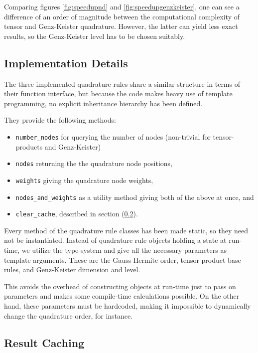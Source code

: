 Comparing figures \ref{fig:speedupnd} and \ref{fig:speedupgenzkeister}, one can
see a difference of an order of magnitude between the computational complexity
of tensor and Genz-Keister quadrature.
However, the latter can yield less exact results, so the Genz-Keister level has
to be chosen suitably.


\subsection{Implementation Details}

The three implemented quadrature rules share a similar structure in terms of
their function interface, but because the code makes heavy use of template
programming, no explicit inheritance hierarchy has been defined.

They provide the following methods:
\begin{itemize}
  \item \texttt{number\_nodes} for querying the number of nodes (non-trivial for
    tensor-products and Genz-Keister)
  \item \texttt{nodes} returning the the quadrature node positions,
  \item \texttt{weights} giving the quadrature node weights,
  \item \texttt{nodes\_and\_weights} as a utility method giving both of the
    above at once, and
  \item \texttt{clear\_cache}, described in section
    (\ref{subsec:resultcaching}).
\end{itemize}

Every method of the quadrature rule classes has been made static, so they need
not be instantiated.
Instead of quadrature rule objects holding a state at run-time, we utilize the
type-system and give all the necessary parameters as template arguments.
These are the Gauss-Hermite order, tensor-product base rules, and Genz-Keister
dimension and level.

This avoids the overhead of constructing objects at run-time just to pass on
parameters and makes some compile-time calculations possible.
On the other hand, these parameters must be hardcoded, making it impossible to
dynamically change the quadrature order, for instance.


\subsection{Result Caching}
\label{subsec:resultcaching}

